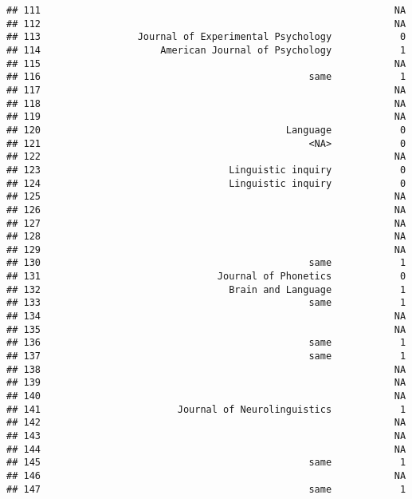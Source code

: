 \documentclass[
  english,
  man]{apa6}
\begin{document}
\begin{verbatim}
## 111                                                              NA
## 112                                                              NA
## 113                 Journal of Experimental Psychology            0
## 114                     American Journal of Psychology            1
## 115                                                              NA
## 116                                               same            1
## 117                                                              NA
## 118                                                              NA
## 119                                                              NA
## 120                                           Language            0
## 121                                               <NA>            0
## 122                                                              NA
## 123                                 Linguistic inquiry            0
## 124                                 Linguistic inquiry            0
## 125                                                              NA
## 126                                                              NA
## 127                                                              NA
## 128                                                              NA
## 129                                                              NA
## 130                                               same            1
## 131                               Journal of Phonetics            0
## 132                                 Brain and Language            1
## 133                                               same            1
## 134                                                              NA
## 135                                                              NA
## 136                                               same            1
## 137                                               same            1
## 138                                                              NA
## 139                                                              NA
## 140                                                              NA
## 141                        Journal of Neurolinguistics            1
## 142                                                              NA
## 143                                                              NA
## 144                                                              NA
## 145                                               same            1
## 146                                                              NA
## 147                                               same            1

\end{verbatim}
\end{document}
